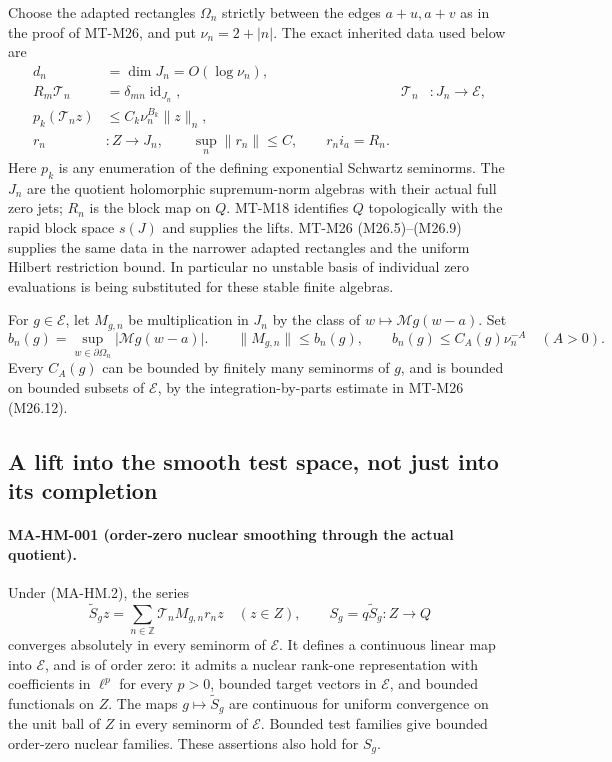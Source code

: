 Choose the adapted rectangles $\Omega_n$ strictly between the
edges $a+u,a+v$ as in the proof of MT-M26, and put $\nu_n=2+|n|$.
The exact inherited data used below are
\[
 \begin{aligned}
 d_n&=\dim J_n=O(\log\nu_n),\\
 R_m\mathcal T_n&=\delta_{mn}\operatorname{id}_{J_n},
       &\mathcal T_n&:J_n\longrightarrow\mathcal E,\\
 p_k(\mathcal T_n z)&\le C_k\nu_n^{B_k}\|z\|_n,\\
 r_n&:Z\longrightarrow J_n,\qquad
       \sup_n\|r_n\|\le C,\qquad r_ni_a=R_n .
 \end{aligned}
 \tag{MA-HM.3}
\]
Here $p_k$ is any enumeration of the defining exponential Schwartz
seminorms.  The $J_n$ are the quotient holomorphic supremum-norm
algebras with their actual full zero jets; $R_n$ is the block map
on $Q$.  MT-M18 identifies $Q$ topologically with the rapid block
space $s(J)$ and supplies the lifts.  MT-M26 (M26.5)--(M26.9)
supplies the same data in the narrower adapted rectangles and
the uniform Hilbert restriction bound.  In particular no
unstable basis of individual zero evaluations is being substituted
for these stable finite algebras.

For $g\in\mathcal E$, let $M_{g,n}$ be multiplication in $J_n$
by the class of $w\mapsto\mathcal Mg(w-a)$.  Set
\[
 b_n(g)=\sup_{w\in\partial\Omega_n}|\mathcal Mg(w-a)|.
 \qquad
 \|M_{g,n}\|\le b_n(g),\qquad
 b_n(g)\le C_A(g)\nu_n^{-A}\quad(A>0).
 \tag{MA-HM.4}
\]
Every $C_A(g)$ can be bounded by finitely many seminorms of $g$,
and is bounded on bounded subsets of $\mathcal E$, by the
integration-by-parts estimate in MT-M26 (M26.12).

\subsection{A lift into the smooth test space, not just into its completion}

\paragraph{MA-HM-001 (order-zero nuclear smoothing through the actual quotient).}
Under (MA-HM.2), the series
\[
 \widetilde S_g z
       =\sum_{n\in\mathbb Z}\mathcal T_nM_{g,n}r_nz
       \quad(z\in Z),\qquad
 S_g=q\widetilde S_g:Z\longrightarrow Q
 \tag{MA-HM.5}
\]
converges absolutely in every seminorm of $\mathcal E$.
It defines a continuous linear map into $\mathcal E$, and is
of order zero: it admits a nuclear rank-one representation with
coefficients in $\ell^p$ for every $p>0$, bounded target vectors
in $\mathcal E$, and bounded functionals on $Z$.
The maps $g\mapsto\widetilde S_g$ are continuous for uniform
convergence on the unit ball of $Z$ in every seminorm of
$\mathcal E$.  Bounded test families give bounded order-zero
nuclear families.  These assertions also hold for $S_g$.

